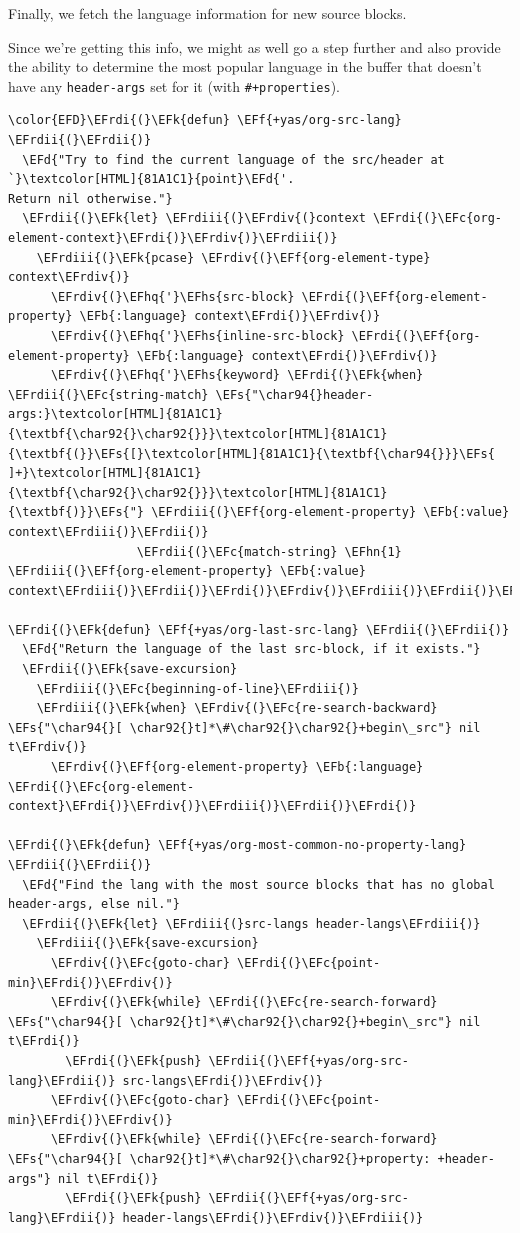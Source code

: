\documentclass{scrartcl}
\newcommand{\EFk}[1]{\textcolor{EFk}{#1}} %
\newcommand{\EFd}[1]{\textcolor{EFd}{#1}} %
\newcommand{\EFs}[1]{\textcolor{EFs}{#1}} %
\newcommand{\EFb}[1]{\textcolor{EFb}{#1}} %
\newcommand{\EFc}[1]{\textcolor{EFc}{#1}} %
\newcommand{\EFf}[1]{\textcolor{EFf}{#1}} %
\newcommand{\EFhn}[1]{#1} %
\newcommand{\EFhq}[1]{#1} %
\newcommand{\EFhs}[1]{#1} %
\newcommand{\EFrdi}[1]{#1} %
\newcommand{\EFrdii}[1]{#1} %
\newcommand{\EFrdiii}[1]{#1} %
\newcommand{\EFrdiv}[1]{#1} %
\begin{document}
Finally, we fetch the language information for new source blocks.

Since we're getting this info, we might as well go a step further and also
provide the ability to determine the most popular language in the buffer that
doesn't have any \texttt{header-args} set for it (with \texttt{\#+properties}).

\begin{Code}
\begin{Verbatim}[]
\color{EFD}\EFrdi{(}\EFk{defun} \EFf{+yas/org-src-lang} \EFrdii{(}\EFrdii{)}
  \EFd{"Try to find the current language of the src/header at `}\textcolor[HTML]{81A1C1}{point}\EFd{'.
Return nil otherwise."}
  \EFrdii{(}\EFk{let} \EFrdiii{(}\EFrdiv{(}context \EFrdi{(}\EFc{org-element-context}\EFrdi{)}\EFrdiv{)}\EFrdiii{)}
    \EFrdiii{(}\EFk{pcase} \EFrdiv{(}\EFf{org-element-type} context\EFrdiv{)}
      \EFrdiv{(}\EFhq{'}\EFhs{src-block} \EFrdi{(}\EFf{org-element-property} \EFb{:language} context\EFrdi{)}\EFrdiv{)}
      \EFrdiv{(}\EFhq{'}\EFhs{inline-src-block} \EFrdi{(}\EFf{org-element-property} \EFb{:language} context\EFrdi{)}\EFrdiv{)}
      \EFrdiv{(}\EFhq{'}\EFhs{keyword} \EFrdi{(}\EFk{when} \EFrdii{(}\EFc{string-match} \EFs{"\char94{}header-args:}\textcolor[HTML]{81A1C1}{\textbf{\char92{}\char92{}}}\textcolor[HTML]{81A1C1}{\textbf{(}}\EFs{[}\textcolor[HTML]{81A1C1}{\textbf{\char94{}}}\EFs{ ]+}\textcolor[HTML]{81A1C1}{\textbf{\char92{}\char92{}}}\textcolor[HTML]{81A1C1}{\textbf{)}}\EFs{"} \EFrdiii{(}\EFf{org-element-property} \EFb{:value} context\EFrdiii{)}\EFrdii{)}
                  \EFrdii{(}\EFc{match-string} \EFhn{1} \EFrdiii{(}\EFf{org-element-property} \EFb{:value} context\EFrdiii{)}\EFrdii{)}\EFrdi{)}\EFrdiv{)}\EFrdiii{)}\EFrdii{)}\EFrdi{)}

\EFrdi{(}\EFk{defun} \EFf{+yas/org-last-src-lang} \EFrdii{(}\EFrdii{)}
  \EFd{"Return the language of the last src-block, if it exists."}
  \EFrdii{(}\EFk{save-excursion}
    \EFrdiii{(}\EFc{beginning-of-line}\EFrdiii{)}
    \EFrdiii{(}\EFk{when} \EFrdiv{(}\EFc{re-search-backward} \EFs{"\char94{}[ \char92{}t]*\#\char92{}\char92{}+begin\_src"} nil t\EFrdiv{)}
      \EFrdiv{(}\EFf{org-element-property} \EFb{:language} \EFrdi{(}\EFc{org-element-context}\EFrdi{)}\EFrdiv{)}\EFrdiii{)}\EFrdii{)}\EFrdi{)}

\EFrdi{(}\EFk{defun} \EFf{+yas/org-most-common-no-property-lang} \EFrdii{(}\EFrdii{)}
  \EFd{"Find the lang with the most source blocks that has no global header-args, else nil."}
  \EFrdii{(}\EFk{let} \EFrdiii{(}src-langs header-langs\EFrdiii{)}
    \EFrdiii{(}\EFk{save-excursion}
      \EFrdiv{(}\EFc{goto-char} \EFrdi{(}\EFc{point-min}\EFrdi{)}\EFrdiv{)}
      \EFrdiv{(}\EFk{while} \EFrdi{(}\EFc{re-search-forward} \EFs{"\char94{}[ \char92{}t]*\#\char92{}\char92{}+begin\_src"} nil t\EFrdi{)}
        \EFrdi{(}\EFk{push} \EFrdii{(}\EFf{+yas/org-src-lang}\EFrdii{)} src-langs\EFrdi{)}\EFrdiv{)}
      \EFrdiv{(}\EFc{goto-char} \EFrdi{(}\EFc{point-min}\EFrdi{)}\EFrdiv{)}
      \EFrdiv{(}\EFk{while} \EFrdi{(}\EFc{re-search-forward} \EFs{"\char94{}[ \char92{}t]*\#\char92{}\char92{}+property: +header-args"} nil t\EFrdi{)}
        \EFrdi{(}\EFk{push} \EFrdii{(}\EFf{+yas/org-src-lang}\EFrdii{)} header-langs\EFrdi{)}\EFrdiv{)}\EFrdiii{)}


\end{Verbatim}
\end{Code}
\end{document}
